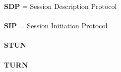 \documentclass[11pt]{article}
\begin{document}
    \textbf{SDP} = Session Description Protocol
    \\\\
    \textbf{SIP} = Session Initiation Protocol
    \\\\
    \textbf{STUN}
    \\\\
    \textbf{TURN}
\end{document}
